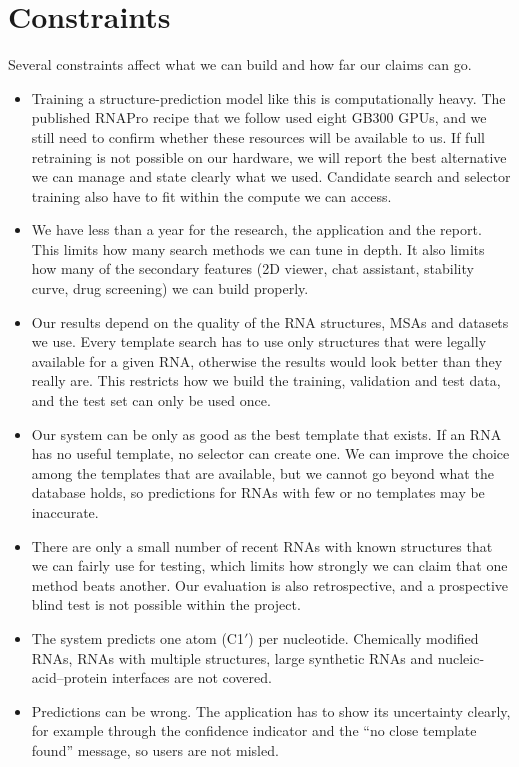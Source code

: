 \documentclass{FastFyp}
\begin{document}
\section{Constraints}
Several constraints affect what we can build and how far our claims can go.
\begin{itemize}
\item Training a structure-prediction model like this is computationally heavy. The published RNAPro recipe that we follow used eight GB300 GPUs, and we still need to confirm whether these resources will be available to us. If full retraining is not possible on our hardware, we will report the best alternative we can manage and state clearly what we used. Candidate search and selector training also have to fit within the compute we can access.
\item We have less than a year for the research, the application and the report. This limits how many search methods we can tune in depth. It also limits how many of the secondary features (2D viewer, chat assistant, stability curve, drug screening) we can build properly.
\item Our results depend on the quality of the RNA structures, MSAs and datasets we use. Every template search has to use only structures that were legally available for a given RNA, otherwise the results would look better than they really are. This restricts how we build the training, validation and test data, and the test set can only be used once.
\item Our system can be only as good as the best template that exists. If an RNA has no useful template, no selector can create one. We can improve the choice among the templates that are available, but we cannot go beyond what the database holds, so predictions for RNAs with few or no templates may be inaccurate.
\item There are only a small number of recent RNAs with known structures that we can fairly use for testing, which limits how strongly we can claim that one method beats another. Our evaluation is also retrospective, and a prospective blind test is not possible within the project.
\item The system predicts one atom (C1$'$) per nucleotide. Chemically modified RNAs, RNAs with multiple structures, large synthetic RNAs and nucleic-acid--protein interfaces are not covered.
\item Predictions can be wrong. The application has to show its uncertainty clearly, for example through the confidence indicator and the ``no close template found'' message, so users are not misled.
\end{itemize}
\end{document}
